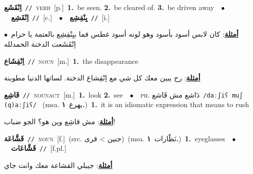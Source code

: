 \documentclass[10pt,a4paper,twoside]{article} %
\begin{document}
\begin{multicols}{2}
{\setlength\topsep{0pt}\textbf{\foreignlanguage{arabic}{اِنْقَشَع}}\ {\color{gray}\texttt{//}\color{black}}\ \textsc{verb}\ [p.]\ \textbf{1.}~be seen.  \textbf{2.}~be cleared of.  \textbf{3.}~be driven away\ \ $\bullet$\ \ \setlength\topsep{0pt}\textbf{\foreignlanguage{arabic}{اِنْقَشِع}}\ {\color{gray}\texttt{//}\color{black}}\ [c.]\ \ $\bullet$\ \ \setlength\topsep{0pt}\textbf{\foreignlanguage{arabic}{يِنْقِشِع}}\ {\color{gray}\texttt{//}\color{black}}\ [i.]\  \begin{flushright}\color{gray}\foreignlanguage{arabic}{\textbf{\underline{\foreignlanguage{arabic}{أمثلة}}}: كان لابس أسود بأسود وهو لونه أسود غطس فما بيِنْقِشِع بالعتمة يا حرام\ $\bullet$\ \  اِنْقَشَعت الدخنة الحمدلله}\end{flushright}\color{black}} \vspace{2mm}

{\setlength\topsep{0pt}\textbf{\foreignlanguage{arabic}{اِنْقِشَاع}}\ {\color{gray}\texttt{//}\color{black}}\ \textsc{noun}\ [m.]\ \textbf{1.}~the disappearance\  \begin{flushright}\color{gray}\foreignlanguage{arabic}{\textbf{\underline{\foreignlanguage{arabic}{أمثلة}}}: رح يبين معك كل شي مع اِنْقِشاع الدخنة. لساتها الدنيا مطوبنة}\end{flushright}\color{black}} \vspace{2mm}

{\setlength\topsep{0pt}\textbf{\foreignlanguage{arabic}{قَاشِع}}\ {\color{gray}\texttt{//}\color{black}}\ \textsc{noun\textunderscore act}\ [m.]\ \textbf{1.}~look  \textbf{2.}~see\ \ $\bullet$\ \ \textsc{ph.} \color{gray} \foreignlanguage{arabic}{دَاشع مش قَاشع}\color{black}\ {\color{gray}\texttt{/{\sffamily daːʃiʕ muʃ (q)aːʃiʕ}/}\color{black}}\ \color{gray} (msa. \foreignlanguage{arabic}{يهرع}~\foreignlanguage{arabic}{\textbf{١.}})\color{black}\ \textbf{1.}~it is an idiomatic expression that means to rush\  \begin{flushright}\color{gray}\foreignlanguage{arabic}{\textbf{\underline{\foreignlanguage{arabic}{أمثلة}}}: مش قاشِع وين هو؟ الجو ضباب!}\end{flushright}\color{black}} \vspace{2mm}

{\setlength\topsep{0pt}\textbf{\foreignlanguage{arabic}{قَشَّاعَة}}\ {\color{gray}\texttt{//}\color{black}}\ \textsc{noun}\ [f.]\ (src. \color{gray}\foreignlanguage{arabic}{جنين > قرى}\color{black})\ \color{gray}(msa. \foreignlanguage{arabic}{نَظّارات}~\foreignlanguage{arabic}{\textbf{١.}})\color{black}\ \textbf{1.}~eyeglasses\ \ $\bullet$\ \ \setlength\topsep{0pt}\textbf{\foreignlanguage{arabic}{قَشَّاعَات}}\ {\color{gray}\texttt{//}\color{black}}\ [f.pl.]\  \begin{flushright}\color{gray}\foreignlanguage{arabic}{\textbf{\underline{\foreignlanguage{arabic}{أمثلة}}}: جيبلي القشاعة معك وانت جاي}\end{flushright}\color{black}} \vspace{2mm}


\end{multicols}
\end{document}
